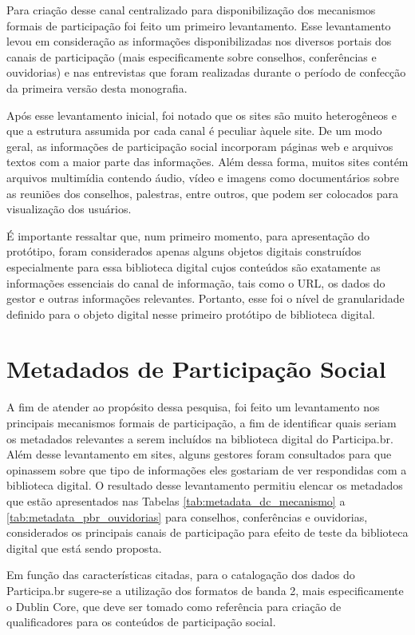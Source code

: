 Para criação desse canal centralizado para disponibilização dos mecanismos formais de participação foi feito um primeiro levantamento. Esse levantamento levou em consideração as informações disponibilizadas nos diversos portais dos canais de participação (mais especificamente sobre conselhos, conferências e ouvidorias) e nas entrevistas que foram realizadas durante o período de confecção da primeira versão desta monografia.

Após esse levantamento inicial, foi notado que os sites são muito heterogêneos e que a estrutura assumida por cada canal é peculiar àquele site. De um modo geral, as informações de participação social incorporam páginas web e arquivos textos com a maior parte das informações. Além dessa forma, muitos sites contém arquivos multimídia contendo áudio, vídeo e imagens como documentários sobre as reuniões dos conselhos, palestras, entre outros, que podem ser colocados para visualização dos usuários.

É importante ressaltar que, num primeiro momento, para apresentação do protótipo, foram considerados apenas alguns objetos digitais construídos especialmente para essa biblioteca digital cujos conteúdos são exatamente as informações essenciais do canal de informação, tais como o URL, os dados do gestor e outras informações relevantes. Portanto, esse foi o nível de granularidade definido para o objeto digital nesse primeiro protótipo de biblioteca digital.

\section{Metadados de Participação Social}
\label{sub:metadadospbr}

A fim de atender ao propósito dessa pesquisa, foi feito um levantamento nos principais mecanismos formais de participação, a fim de identificar quais seriam os metadados relevantes a serem incluídos na biblioteca digital do Participa.br. Além desse levantamento em sites, alguns gestores foram consultados para que opinassem sobre que tipo de informações eles gostariam de ver respondidas com a biblioteca digital. O resultado desse levantamento permitiu elencar os metadados que estão apresentados nas Tabelas \ref{tab:metadata_dc_mecanismo} a \ref{tab:metadata_pbr_ouvidorias} para conselhos, conferências e ouvidorias, considerados os principais canais de participação para efeito de teste da biblioteca digital que está sendo proposta.

Em função das características citadas, para o catalogação dos dados do Participa.br sugere-se a utilização dos formatos de banda 2, mais especificamente o Dublin Core, que deve ser tomado como referência para criação de qualificadores para os conteúdos de participação social.

